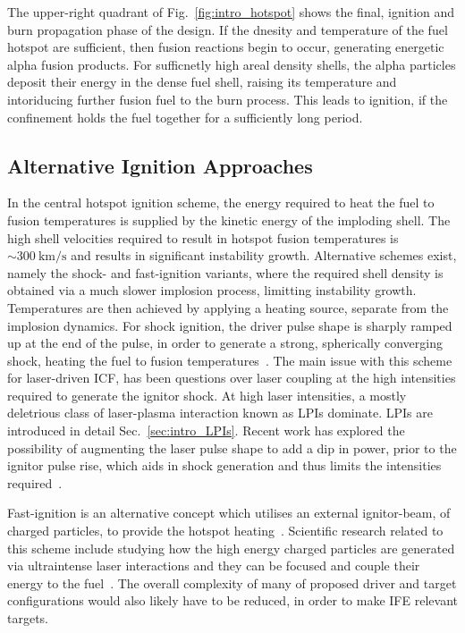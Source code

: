The upper-right quadrant of Fig.~\ref{fig:intro_hotspot} shows the final, ignition and burn propagation phase of the design.
If the dnesity and temperature of the fuel hotspot are sufficient, then fusion reactions begin to occur, generating energetic alpha fusion products.
For sufficnetly high areal density shells, the alpha particles deposit their energy in the dense fuel shell, raising its temperature and intoriducing further fusion fuel to the burn process.
This leads to ignition, if the confinement holds the fuel together for a sufficiently long period.

\subsection{Alternative Ignition Approaches}%
\label{sec:intro_icf_alt}

In the central hotspot ignition scheme, the energy required to heat the fuel to fusion temperatures is supplied by the kinetic energy of the imploding shell.
The high shell velocities required to result in hotspot fusion temperatures is $\sim300\ \text{km/s}$ and results in significant instability growth.
Alternative schemes exist, namely the shock- and fast-ignition variants, where the required shell density is obtained via a much slower implosion process, limitting instability growth.
Temperatures are then achieved by applying a heating source, separate from the implosion dynamics.
For shock ignition, the driver pulse shape is sharply ramped up at the end of the pulse, in order to generate a strong, spherically converging shock, heating the fuel to fusion temperatures~\cite{betti_shock_2007,perkins_shock_2009}.
The main issue with this scheme for laser-driven \ac{ICF}, has been questions over laser coupling at the high intensities required to generate the ignitor shock.
At high laser intensities, a mostly deletrious class of laser-plasma interaction known as \ac{LPIs} dominate.
\ac{LPIs} are introduced in detail Sec.~\ref{sec:intro_LPIs}.
Recent work has explored the possibility of augmenting the laser pulse shape to add a dip in power, prior to the ignitor pulse rise, which aids in shock generation and thus limits the intensities required~\cite{scott_shock-augmented_2022}.

Fast-ignition is an alternative concept which utilises an external ignitor-beam, of charged particles, to provide the hotspot heating~\cite{tabak_ignition_1994}.
Scientific research related to this scheme include studying how the high energy charged particles are generated via ultraintense laser interactions and they can be focused and couple their energy to the fuel~\cite{jarrott_visualizing_2016,gong_direct_2019}.
The overall complexity of many of proposed driver and target configurations would also likely have to be reduced, in order to make \ac{IFE} relevant targets.

